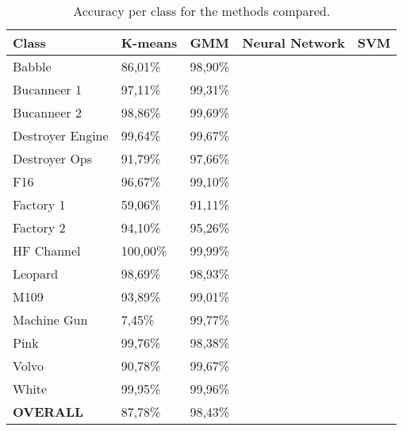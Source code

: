 \documentclass[12pt]{article}
\begin{document}
\begin{table}[ht]
\centering
\caption{Accuracy per class for the methods compared.}
\label{tab:acc}
\begin{tabular}{l|llll}
\hline
Class & K-means & GMM & Neural Network & SVM \\
\hline
Babble & 86,01\% & 98,90\% & & \\
Bucanneer 1 & 97,11\% & 99,31\% & & \\
Bucanneer 2 & 98,86\% & 99,69\% & & \\
Destroyer Engine & 99,64\% & 99,67\% & & \\
Destroyer Ops & 91,79\% & 97,66\% & &\\
F16 & 96,67\% & 99,10\% & &\\
Factory 1 & 59,06\% & 91,11\% & &\\
Factory 2 & 94,10\% & 95,26\% & &\\
HF Channel & 100,00\% & 99,99\% & &\\
Leopard & 98,69\% & 98,93\% & &\\
M109 & 93,89\% & 99,01\% & &\\
Machine Gun & 7,45\% & 99,77\% & &\\
Pink & 99,76\% & 98,38\% & &\\
Volvo & 90,78\% & 99,67\% & &\\
White & 99,95\% & 99,96\% & &\\
\hline
\textbf{OVERALL} & 87,78\% & 98,43\% & & \\
\hline
\end{tabular}
\end{table}
\end{document}
